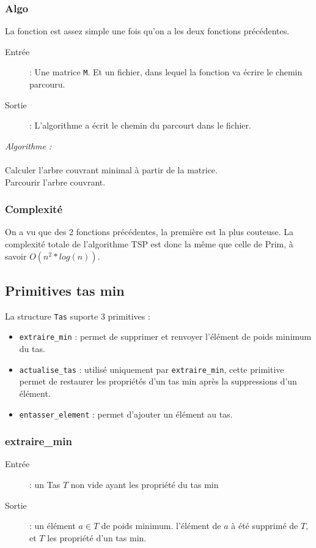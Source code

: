 \documentclass[a4paper,11pt]{article}
\begin{document}
\subsubsection*{Algo}
La fonction est assez simple une fois qu'on a les deux fonctions précédentes.
\begin{description}
\item[Entrée] : Une matrice \texttt{M}. Et un fichier, dans lequel la fonction va écrire le chemin parcouru.
\item[Sortie] : L'algorithme a écrit le chemin du parcourt dans le fichier.\\
\end{description}

\textit{Algorithme : }\\
\\
Calculer l'arbre couvrant minimal à partir de la matrice.\\
Parcourir l'arbre couvrant.\\

\subsubsection*{Complexité}
On a vu que des 2 fonctions précédentes, la première est la plus couteuse.
La complexité totale de l'algorithme TSP est donc la même que celle de Prim, à savoir $O(n^2*log(n))$.

\subsection{Primitives tas min} %
La structure \texttt{Tas} suporte 3 primitives :
\begin{itemize}
\item \texttt{extraire\_min} : permet de supprimer et renvoyer l’élément de poids minimum du tas.
\item \texttt{actualise\_tas} : utilisé uniquement par \texttt{extraire\_min}, cette primitive permet de restaurer les propriétés d'un tas min après la suppressions d'un élément.
\item \texttt{entasser\_element} : permet d'ajouter un élément au tas.
\end{itemize}
\subsubsection*{extraire\_min}
\begin{description}
\item[Entrée] : un \textsf{Tas} $T$ non vide ayant les propriété du tas min
\item[Sortie] : un élément $a \in T$ de poids minimum. l'élément de $a$ à été supprimé de $T$, et $T$  les propriété d'un tas min.
\end{description}
\end{document}
